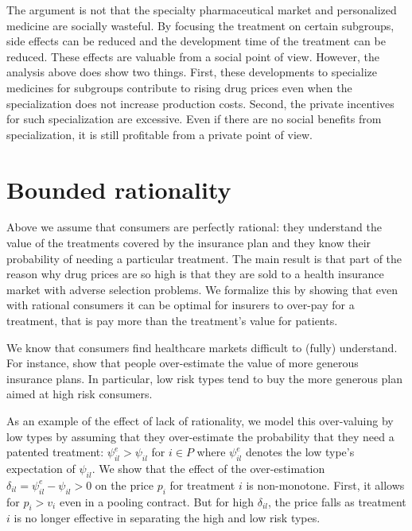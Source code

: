 \documentclass[12pt,english,a4paper]{article}
\begin{document}
The argument is not that the specialty pharmaceutical market and personalized medicine are socially wasteful. By focusing the treatment on certain subgroups, side effects can be reduced and the development time of the treatment can be reduced. These effects are valuable from a social point of view. However, the analysis above does show two things. First, these developments to specialize medicines for subgroups contribute to rising drug prices even when the specialization does not increase production costs. Second, the private incentives for such specialization are excessive. Even if there are no social benefits from specialization, it is still profitable from a private point of view.


\section{Bounded rationality}
\label{sec:org7ce2dd6}

Above we assume that consumers are perfectly rational: they understand the value of the treatments covered by the insurance plan and they know their probability of needing a particular treatment. The main result is that part of the reason why drug prices are so high is that they are sold to a health insurance market with adverse selection problems. We formalize this by showing that even with rational consumers it can be optimal for insurers to over-pay for a treatment, that is pay more than the treatment's value for patients.

We know that consumers find healthcare markets difficult to (fully) understand. For instance, \cite{handel-2015-healt-insur-human} show that people over-estimate the value of more generous insurance plans. In particular, low risk types tend to buy the more generous plan aimed at high risk consumers.

As an example of the effect of lack of rationality, we model this over-valuing by low types by assuming that they over-estimate the probability that they need a patented treatment: \(\psi_{il}^e > \psi_{il}\) for \(i \in P\) where \(\psi_{il}^e\) denotes the low type's expectation of \(\psi_{il}\). We show that the effect of the over-estimation \(\delta_{il} = \psi_{il}^e-\psi_{il}>0\) on the price \(p_i\) for treatment \(i\) is non-monotone. First, it allows for \(p_i>v_i\) even in a pooling contract. But for high \(\delta_{il}\), the price falls as treatment \(i\) is no longer effective in separating the high and low risk types.
\end{document}
